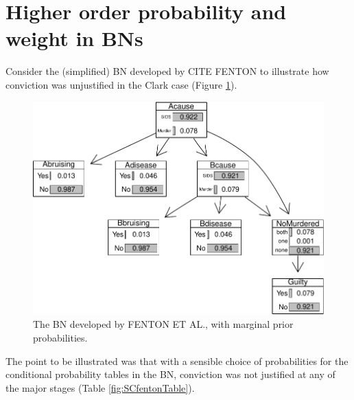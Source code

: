 \documentclass[
  10pt,
  dvipsnames,enabledeprecatedfontcommands]{scrartcl}
\begin{document}

\hypertarget{higher-order-probability-and-weight-in-bns}{%
\section{Higher order probability and weight in
BNs}\label{higher-order-probability-and-weight-in-bns}}

Consider the (simplified) BN developed by CITE FENTON to illustrate how
conviction was unjustified in the Clark case (Figure
\ref{fig:scBNplot}).

\begin{figure}

\begin{center}\includegraphics[width=0.9\linewidth]{imprecision_weight_files/figure-latex/scBNplot-1} \end{center}
\caption{The BN developed by FENTON ET AL., with marginal prior probabilities.}
\label{fig:scBNplot}
\end{figure}

The point to be illustrated was that with a sensible choice of
probabilities for the conditional probability tables in the BN,
conviction was not justified at any of the major stages (Table
\ref{fig:SCfentonTable}).
\end{document}
